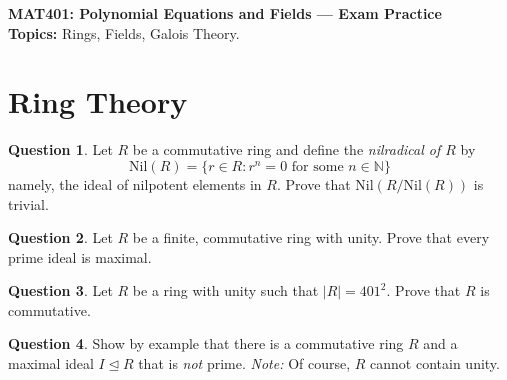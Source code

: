\documentclass[11pt]{article}
\def\mbb{\mathbb}
\def\R{\mbb{R}}
\def\N{\mbb{N}}
\def\vs{\vspace{5mm}}
\theoremstyle{pink}
\theoremstyle{boxedsolution}
\theoremstyle{definition}
\newtheorem{question}{Question}
\theoremstyle{claim}
\begin{document}
\thispagestyle{empty}

\begin{framed}
    \begin{center}
        \large\textbf{MAT401: Polynomial Equations and Fields --- Exam Practice} \vspace{3mm}\\
        \textbf{Topics:} Rings, Fields, Galois Theory.
    \end{center}
\end{framed}


\section*{Ring Theory}

\begin{question}
    Let $R$ be a commutative ring and define the \textit{nilradical of $R$} by 
    \[
    \mathrm{Nil}(R) = \{r \in R: r^n = 0 \text{ for some } n \in \N\}
    \]
    namely, the ideal of nilpotent elements in $R$. Prove that $\mathrm{Nil}(R/\mathrm{Nil}(R))$ is trivial.
\end{question}

\begin{question}
    Let $R$ be a finite, commutative ring with unity. Prove that every prime ideal is maximal.
\end{question}

\begin{question}
    Let $R$ be a ring with unity such that  $|R| = 401^2$. Prove that $R$ is commutative.
\end{question}

\begin{question}
    Show by example that there is a commutative ring $R$ and a maximal ideal $I \trianglelefteq R$ that is \textit{not} prime. \textit{Note:} Of course, $R$ cannot contain unity.
\end{question}

\end{document}
